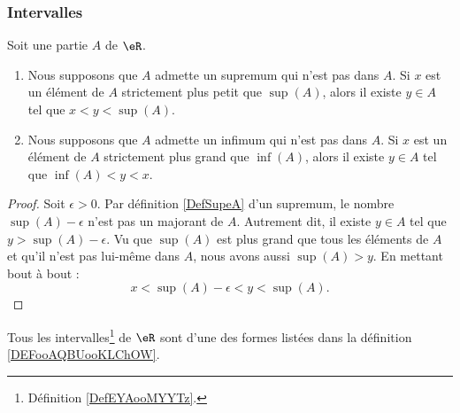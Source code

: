 \subsubsection{Intervalles}

\begin{lemma}        \label{LEMooRMUCooMKiTGr}
	Soit une partie \( A\) de \( \eR\).
	\begin{enumerate}
		\item       \label{ITEMooIQECooFjJFKz}
		      Nous supposons que \( A\) admette un supremum qui n'est pas dans \( A\). Si \( x\) est un élément de \( A\) strictement plus petit que \( \sup(A)\), alors il existe \( y\in A\) tel que \( x<y<\sup(A)\).
		\item
		      Nous supposons que \( A\) admette un infimum qui n'est pas dans \( A\). Si \( x\) est un élément de \( A\) strictement plus grand que \( \inf(A)\), alors il existe \( y\in A\) tel que \(  \inf(A)<y<x  \).
	\end{enumerate}
\end{lemma}

\begin{proof}
	Soit \( \epsilon>0\). Par définition \ref{DefSupeA} d'un supremum, le nombre \( \sup(A)-\epsilon\) n'est pas un majorant de \( A\). Autrement dit, il existe \( y\in A\) tel que \( y>\sup(A)-\epsilon\). Vu que \( \sup(A)\) est plus grand que tous les éléments de \( A\) et qu'il n'est pas lui-même dans \( A\), nous avons aussi \( \sup(A)>y\). En mettant bout à bout :
	\begin{equation}
		x<\sup(A)-\epsilon<y<\sup(A).
	\end{equation}
\end{proof}

\begin{proposition}     \label{PROPooHPMWooQJXCAS}
	Tous les intervalles\footnote{Définition \ref{DefEYAooMYYTz}.} de \( \eR\) sont d'une des formes listées dans la définition \ref{DEFooAQBUooKLChOW}.
\end{proposition}

